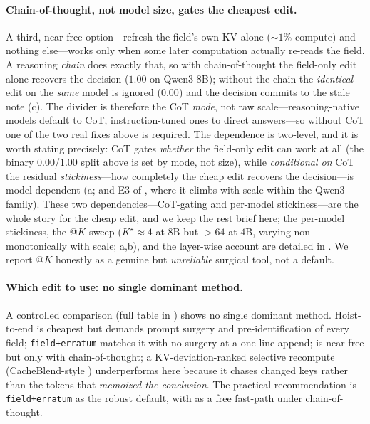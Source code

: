 \paragraph{Chain-of-thought, not model size, gates the cheapest edit.} A third, near-free option---refresh
the field's own KV alone (${\sim}1\%$ compute) and nothing else---works only when some later computation
actually re-reads the field. A reasoning \emph{chain} does exactly that, so with chain-of-thought the
field-only edit alone recovers the decision ($1.00$ on Qwen3-8B); without the chain the \emph{identical}
edit on the \emph{same} model is ignored ($0.00$) and the decision commits to the stale note
(c). The divider is therefore the CoT \emph{mode}, not raw scale---reasoning-native
models default to CoT, instruction-tuned ones to direct answers---so without CoT one of the two real fixes
above is required. The dependence is two-level, and it is worth stating precisely: CoT gates \emph{whether}
the field-only edit can work at all (the binary $0.00$/$1.00$ split above is set by mode, not size), while
\emph{conditional on} CoT the residual \emph{stickiness}---how completely the cheap edit recovers the
decision---is model-dependent (a; and E3 of , where it climbs with scale
within the Qwen3 family). These two dependencies---CoT-gating and per-model stickiness---are the whole story for the cheap edit, and we keep the rest brief here; the per-model
stickiness, the \fieldsel{}@$K$ sweep ($K^\star\approx 4$ at $8$B but $>64$ at $4$B, varying
non-monotonically with scale; a,b), and the layer-wise account are detailed in
. We report
\fieldsel{}@$K$ honestly as a genuine but \emph{unreliable} surgical tool, not a default.

\paragraph{Which edit to use: no single dominant method.} A controlled comparison (full table in ) shows no single
dominant method. Hoist-to-end is cheapest but demands prompt surgery and pre-identification of every field;
\texttt{field+erratum} matches it with no surgery at a one-line append; \inplace{} is near-free but only
with chain-of-thought; a KV-deviation-ranked selective recompute (CacheBlend-style \citep{yao2025cacheblend}) underperforms here
because it chases changed keys rather than the tokens that \emph{memoized the conclusion}. The practical
recommendation is \texttt{field+erratum} as the robust default, with \inplace{} as a free fast-path under
chain-of-thought.

